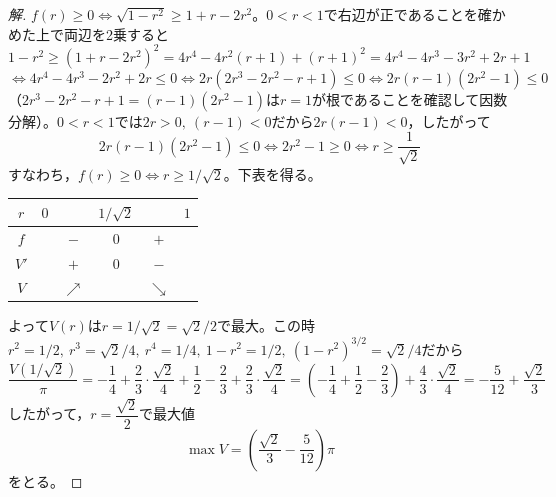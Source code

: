 \documentclass[../main.tex]{subfiles}
\begin{document}
\begin{proof}[解]
  $f(r)\ge0\iff\sqrt{1-r^2}\ge1+r-2r^2$。$0<r<1$で右辺が正であることを確かめた上で両辺を2乗すると
  \[
    1-r^2\ge(1+r-2r^2)^2=4r^4-4r^2(r+1)+(r+1)^2=4r^4-4r^3-3r^2+2r+1
  \]
  \[
    \iff4r^4-4r^3-2r^2+2r\le0\iff2r(2r^3-2r^2-r+1)\le0\iff2r(r-1)(2r^2-1)\le0
  \]
  （$2r^3-2r^2-r+1=(r-1)(2r^2-1)$は$r=1$が根であることを確認して因数分解）。$0<r<1$では$2r>0,\ (r-1)<0$だから$2r(r-1)<0$，したがって
  \[
    2r(r-1)(2r^2-1)\le0\iff2r^2-1\ge0\iff r\ge\frac1{\sqrt2}
  \]
  すなわち，$f(r)\ge0\iff r\ge1/\sqrt2$。下表を得る。
  \begin{center}
    \begin{tabular}{c|ccccc}
      $r$ & $0$ & & $1/\sqrt2$ & & $1$ \\
      \hline
      $f$ & & $-$ & $0$ & $+$ & \\
      \hline
      $V'$ & & $+$ & $0$ & $-$ & \\
      \hline
      $V$ & & $\nearrow$ & & $\searrow$ &
    \end{tabular}
  \end{center}
  よって$V(r)$は$r=1/\sqrt2=\sqrt2/2$で最大。この時$r^2=1/2,\ r^3=\sqrt2/4,\ r^4=1/4,\ 1-r^2=1/2,\ (1-r^2)^{3/2}=\sqrt2/4$だから
  \[
    \frac{V(1/\sqrt2)}\pi=-\frac14+\frac23\cdot\frac{\sqrt2}4+\frac12-\frac23+\frac23\cdot\frac{\sqrt2}4=\left(-\frac14+\frac12-\frac23\right)+\frac{4}{3}\cdot\frac{\sqrt2}4=-\frac5{12}+\frac{\sqrt2}3
  \]
  したがって，$r=\dfrac{\sqrt2}2$で最大値
  \[
    \max V=\left(\frac{\sqrt2}3-\frac5{12}\right)\pi
  \]
  をとる。
\end{proof}
\end{document}
